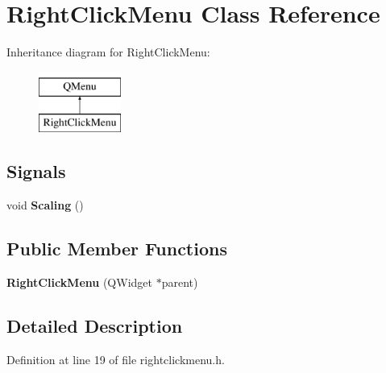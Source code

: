 \hypertarget{class_right_click_menu}{}\section{Right\+Click\+Menu Class Reference}
\label{class_right_click_menu}
Inheritance diagram for Right\+Click\+Menu\+:\begin{figure}[H]
\begin{center}
\leavevmode
\includegraphics[height=2.000000cm]{class_right_click_menu}
\end{center}
\end{figure}
\subsection*{Signals}
\begin{DoxyCompactItemize}
\item 
void {\bfseries Scaling} ()\hypertarget{class_right_click_menu_a5607dbc6616a76b431cd77ce47d6a1ee}{}\label{class_right_click_menu_a5607dbc6616a76b431cd77ce47d6a1ee}

\end{DoxyCompactItemize}
\subsection*{Public Member Functions}
\begin{DoxyCompactItemize}
\item 
{\bfseries Right\+Click\+Menu} (Q\+Widget $\ast$parent)\hypertarget{class_right_click_menu_afa4f52467f82c6d5de54999ba037428f}{}\label{class_right_click_menu_afa4f52467f82c6d5de54999ba037428f}

\end{DoxyCompactItemize}


\subsection{Detailed Description}


Definition at line 19 of file rightclickmenu.\+h.

